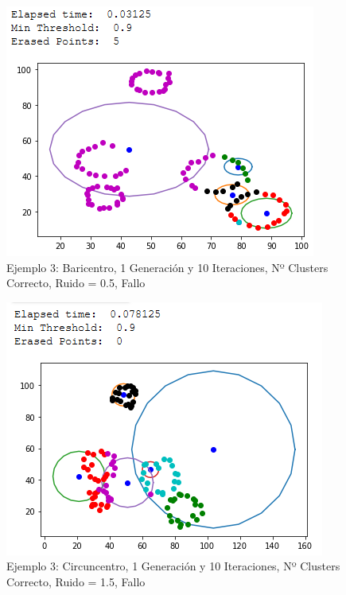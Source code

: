 \documentclass[conference,a4paper]{IEEEtran}
\begin{document}
\begin{figure}[H]
\centering
\includegraphics[scale=0.65]{Experimentacion/Ejemplo3/ej3_b_1_10_lr_wrong}
\caption{Ejemplo 3: Baricentro, 1 Generación y 10 Iteraciones,  Nº Clusters Correcto, Ruido = 0.5, Fallo\\}
\end{figure}

\begin{figure}[H]
\centering
\includegraphics[scale=0.65]{Experimentacion/Ejemplo3/ej3_c_1_10_mr}
\caption{Ejemplo 3: Circuncentro, 1 Generación y 10 Iteraciones,  Nº Clusters Correcto, Ruido = 1.5, Fallo\\}
\end{figure}
\end{document}
